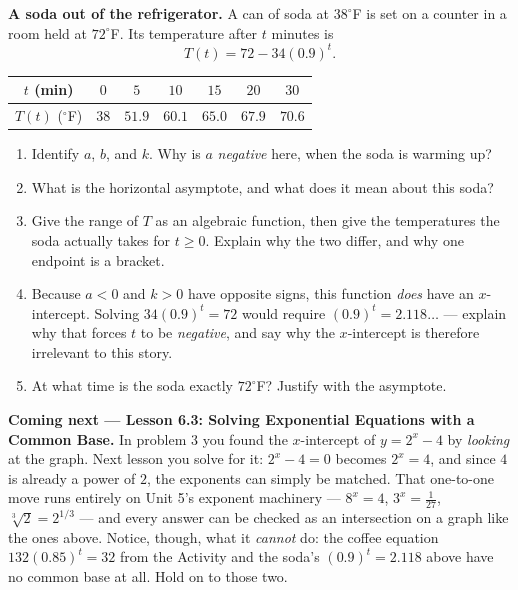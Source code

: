 \documentclass[10pt]{article}
\begin{document}
\begin{extensionbox}
\textbf{A soda out of the refrigerator.} A can of soda at $38^{\circ}$F is set on a counter in a
room held at $72^{\circ}$F. Its temperature after $t$ minutes is
\[
  T(t) = 72 - 34(0.9)^{t}.
\]
\begin{center}
\renewcommand{\arraystretch}{1.25}
\begin{tabular}{|c|c|c|c|c|c|c|}
\hline
$t$ (min) & $0$ & $5$ & $10$ & $15$ & $20$ & $30$ \\ \hline
$T(t)$ ($^{\circ}$F) & $38$ & $51.9$ & $60.1$ & $65.0$ & $67.9$ & $70.6$ \\ \hline
\end{tabular}
\end{center}
\begin{enumerate}[label=(\alph*), leftmargin=1.8em, itemsep=5pt]
  \item Identify $a$, $b$, and $k$. Why is $a$ \emph{negative} here, when the soda is warming up?
  \item What is the horizontal asymptote, and what does it mean about this soda?
  \item Give the range of $T$ as an algebraic function, then give the temperatures the soda actually
        takes for $t\ge0$. Explain why the two differ, and why one endpoint is a bracket.
  \item Because $a<0$ and $k>0$ have opposite signs, this function \emph{does} have an
        $x$-intercept. Solving $34(0.9)^{t}=72$ would require $(0.9)^{t}=2.118\ldots$ --- explain why
        that forces $t$ to be \emph{negative}, and say why the $x$-intercept is therefore irrelevant
        to this story.
  \item At what time is the soda exactly $72^{\circ}$F? Justify with the asymptote.
\end{enumerate}
\end{extensionbox}

\begin{spiralbox}
\textbf{Coming next --- Lesson 6.3: Solving Exponential Equations with a Common Base.} In problem 3
you found the $x$-intercept of $y=2^{x}-4$ by \emph{looking} at the graph. Next lesson you solve for
it: $2^{x}-4=0$ becomes $2^{x}=4$, and since $4$ is already a power of $2$, the exponents can simply
be matched. That one-to-one move runs entirely on Unit 5's exponent machinery --- $8^{x}=4$,
$3^{x}=\frac{1}{27}$, $\sqrt[3]{2}=2^{1/3}$ --- and every answer can be checked as an intersection on
a graph like the ones above. Notice, though, what it \emph{cannot} do: the coffee equation
$132(0.85)^{t}=32$ from the Activity and the soda's $(0.9)^{t}=2.118$ above have no common base at
all. Hold on to those two.
\end{spiralbox}
\end{document}
